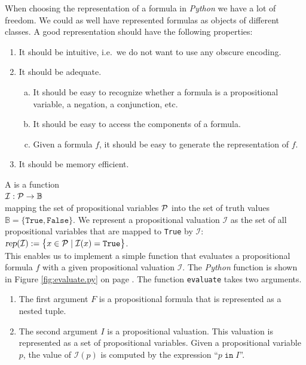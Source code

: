 When choosing the representation of a formula in \textsl{Python} we have a lot of freedom.
We could as well have represented formulas as objects of different classes.  A good representation should have
the following properties:
\begin{enumerate}
\item It should be intuitive, i.e.~we do not want to use any obscure encoding.
\item It should be adequate.
  \begin{enumerate}[(a)]
  \item It should be easy to recognize whether a formula is a propositional variable, a negation, a
        conjunction, etc.
  \item It should be easy to access the components of a formula.
  \item Given a formula $f$, it should be easy to generate the representation of $f$.
  \end{enumerate}
\item It should be memory efficient.
\end{enumerate}

A  is a function  
\\[0.2cm]
\hspace*{1.3cm} ${\cal I}: {\cal P} \rightarrow \mathbb{B}$ \\[0.2cm]
mapping the set of propositional variables ${\cal P}$ into the set of truth values
$\mathbb{B} = \bigl\{ \mathtt{True}, \mathtt{False} \bigr\}$.
We represent a propositional valuation $\mathcal{I}$ as the set of all propositional variables that are mapped
to \texttt{True} by $\mathcal{I}$:
\\[0.2cm]
\hspace*{1.3cm}
$\textsl{rep}(\mathcal{I}) := \bigl\{ x \in \mathcal{P} \mid \mathcal{I}(x) = \texttt{True} \bigr\}$.
\\[0.2cm]
This enables us to implement a simple function that evaluates a propositional formula $f$ with a given
propositional valuation $\mathcal{I}$.
The \textsl{Python} function  is shown in Figure \ref{fig:evaluate.py} on page
\pageref{fig:evaluate.py}. 
The function \texttt{evaluate} takes two arguments.
\begin{enumerate}
\item The first argument $F$ is a propositional formula that is represented as a nested tuple.
\item The second argument $I$ is a propositional valuation.  This valuation is represented as a set of
      propositional variables. Given a propositional variable $p$, the value of $\mathcal{I}(p)$ is computed
      by the expression  ``$p \;\mathtt{in}\; I$''.
\end{enumerate}

